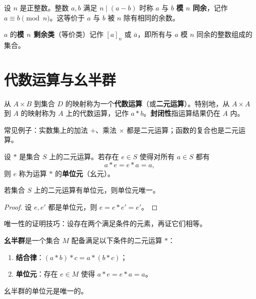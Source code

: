 \begin{definition}[同余关系与剩余类]
设 $n$ 是正整数。整数 $a, b$ 满足 $n \mid (a-b)$ 时称 $a$ 与 $b$ \textbf{模 $n$ 同余}，记作 $a \equiv b \pmod{n}$。这等价于 $a$ 与 $b$ 被 $n$ 除有相同的余数。

$a$ 的\textbf{模 $n$ 剩余类}（等价类）记作 $[a]_n$ 或 $\bar{a}$，即所有与 $a$ 模 $n$ 同余的整数组成的集合。
\end{definition}

\section{代数运算与幺半群}

\begin{definition}[代数运算]
从 $A \times B$ 到集合 $D$ 的映射称为一个\textbf{代数运算}（或\textbf{二元运算}）。特别地，从 $A \times A$ 到 $A$ 的映射称为 $A$ 上的代数运算，记作 $a * b$。\textbf{封闭性}指运算结果仍在 $A$ 内。
\end{definition}

\begin{note}
常见例子：实数集上的加法 $+$、乘法 $\times$ 都是二元运算；函数的复合也是二元运算。
\end{note}

\begin{definition}[单位元]
设 $*$ 是集合 $S$ 上的二元运算。若存在 $e \in S$ 使得对所有 $a \in S$ 都有
\[
  a * e = e * a = a,
\]
则 $e$ 称为运算 $*$ 的\textbf{单位元}（幺元）。
\end{definition}

\begin{theorem}[单位元唯一性]
若集合 $S$ 上的二元运算有单位元，则单位元唯一。
\end{theorem}

\begin{proof}
设 $e, e'$ 都是单位元，则 $e = e * e' = e'$。
\end{proof}

\begin{note}
唯一性的证明技巧：设存在两个满足条件的元素，再证它们相等。
\end{note}

\begin{definition}[幺半群（定义 1.2，1.3）]
\textbf{幺半群}是一个集合 $M$ 配备满足以下条件的二元运算 $*$：
\begin{enumerate}
  \item \textbf{结合律}：$(a * b) * c = a * (b * c)$；
  \item \textbf{单位元}：存在 $e \in M$ 使得 $a * e = e * a = a$。
\end{enumerate}
幺半群的单位元是唯一的。
\end{definition}

